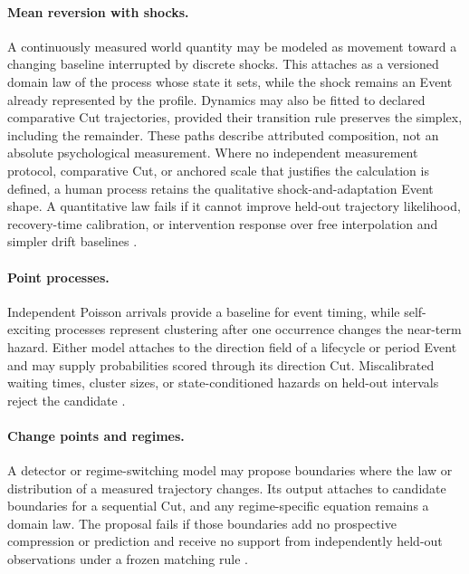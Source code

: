 \documentclass[10pt]{article}
\begin{document}
\paragraph{Mean reversion with shocks.}
A continuously measured world quantity may be modeled as movement toward a
changing baseline interrupted by discrete shocks. This attaches as a versioned domain law of the process whose state it sets, while the shock remains an Event already represented
by the profile. Dynamics may
also be fitted to declared comparative Cut trajectories, provided their
transition rule preserves the simplex, including the remainder. These paths
describe attributed composition, not an absolute psychological measurement.
Where no independent measurement protocol, comparative Cut, or anchored scale
that justifies the calculation is defined, a human process retains the
qualitative shock-and-adaptation Event shape. A quantitative law fails if it
cannot improve held-out trajectory likelihood, recovery-time calibration, or
intervention response over free interpolation and simpler drift baselines
\cite{uhlenbeckOrnstein1930,merton1976jump}.

\paragraph{Point processes.}
Independent Poisson arrivals provide a baseline for event timing, while
self-exciting processes represent clustering after one occurrence changes the
near-term hazard. Either model attaches to the direction field of a lifecycle
or period Event and may supply probabilities scored through its direction Cut. Miscalibrated waiting times, cluster sizes, or
state-conditioned hazards on held-out intervals reject the candidate
\cite{hawkes1971,meiEisner2017}.

\paragraph{Change points and regimes.}
A detector or regime-switching model may propose boundaries where the law or
distribution of a measured trajectory changes. Its output attaches to candidate
boundaries for a sequential Cut, and any regime-specific equation remains a domain law. The proposal fails if those
boundaries add no prospective compression or prediction and receive no support
from independently held-out observations under a frozen matching rule
\cite{killick2012changepoints,goebel2009hybrid}.
\end{document}
